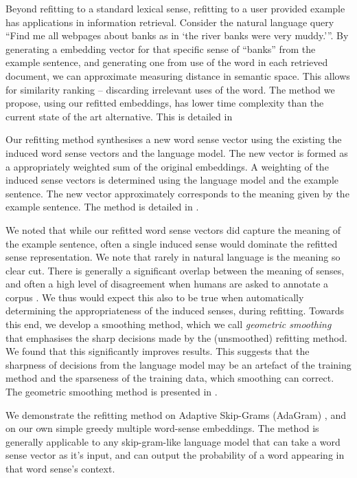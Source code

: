 \documentclass{sig-alternate}
\begin{document}
Beyond refitting to a standard lexical sense, refitting to a user provided example has applications in information retrieval. Consider the natural language query \enquote{Find me all webpages about banks as in \enquote{the river banks were very muddy.}}. By generating a embedding vector for that specific sense of ``banks'' from the example sentence, and generating one from use of the word in each retrieved document, we can approximate measuring distance in semantic space. This allows for similarity ranking -- discarding irrelevant uses of the word. The method we propose, using our refitted embeddings, has lower time complexity than the current state of the art alternative. This is detailed in 

Our refitting method synthesises a new word sense vector using the existing the induced word sense vectors and the language model.
The new vector is formed as a appropriately weighted sum of the original embeddings. A weighting of the induced sense vectors is determined using the language model and the example sentence. The new vector approximately corresponds to the meaning given by the example sentence. The method is detailed in .

We noted that while our refitted word sense vectors did capture the meaning of the example sentence, often a single induced sense would dominate the refitted sense representation. We note that rarely in natural language is the meaning so clear cut. There is generally a  significant overlap between the meaning of senses, and often a high level of disagreement when humans are asked to annotate a corpus \parencite{veronis1998study}. We thus would expect this also to be true when automatically determining the appropriateness of the induced senses, during refitting. Towards this end, we develop a smoothing method, which we call \emph{geometric smoothing} that emphasises the sharp decisions made by the (unsmoothed) refitting method. We found that this significantly improves results. This suggests that the sharpness of decisions from the language model may be an artefact of the training method and the sparseness of the training data, which smoothing can correct. The geometric smoothing method is presented in .



We demonstrate the refitting method on Adaptive Skip-Grams (AdaGram) \parencite{AdaGrams}, and on our own simple greedy multiple word-sense embeddings. The method is generally applicable to any skip-gram-like language model that can take a word sense vector as it's input, and can output the probability of a word appearing in that word sense's context.
\end{document}
